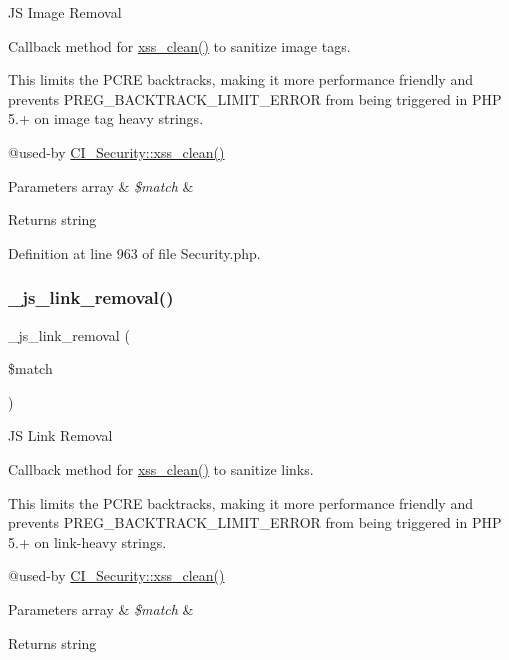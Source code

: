 JS Image Removal

Callback method for \mbox{\hyperlink{class_c_i___security_acb759426dbab128d3d8164805225381c}{xss\+\_\+clean()}} to sanitize image tags.

This limits the P\+C\+RE backtracks, making it more performance friendly and prevents P\+R\+E\+G\+\_\+\+B\+A\+C\+K\+T\+R\+A\+C\+K\+\_\+\+L\+I\+M\+I\+T\+\_\+\+E\+R\+R\+OR from being triggered in P\+HP 5.+ on image tag heavy strings.

@used-\/by \mbox{\hyperlink{class_c_i___security_acb759426dbab128d3d8164805225381c}{C\+I\+\_\+\+Security\+::xss\+\_\+clean()}} 
\begin{DoxyParams}[1]{Parameters}
array & {\em \$match} & \\
\hline
\end{DoxyParams}
\begin{DoxyReturn}{Returns}
string 
\end{DoxyReturn}


Definition at line 963 of file Security.\+php.

\mbox{\label{class_c_i___security_a6b1744acaf85e05c65ab17242dea4f06}} 
\subsubsection{\texorpdfstring{\_js\_link\_removal()}{\_js\_link\_removal()}}
{\footnotesize\ttfamily \+\_\+js\+\_\+link\+\_\+removal (\begin{DoxyParamCaption}\item[{}]{\$match }\end{DoxyParamCaption})\hspace{0.3cm}{\ttfamily [protected]}}

JS Link Removal

Callback method for \mbox{\hyperlink{class_c_i___security_acb759426dbab128d3d8164805225381c}{xss\+\_\+clean()}} to sanitize links.

This limits the P\+C\+RE backtracks, making it more performance friendly and prevents P\+R\+E\+G\+\_\+\+B\+A\+C\+K\+T\+R\+A\+C\+K\+\_\+\+L\+I\+M\+I\+T\+\_\+\+E\+R\+R\+OR from being triggered in P\+HP 5.+ on link-\/heavy strings.

@used-\/by \mbox{\hyperlink{class_c_i___security_acb759426dbab128d3d8164805225381c}{C\+I\+\_\+\+Security\+::xss\+\_\+clean()}} 
\begin{DoxyParams}[1]{Parameters}
array & {\em \$match} & \\
\hline
\end{DoxyParams}
\begin{DoxyReturn}{Returns}
string 
\end{DoxyReturn}



